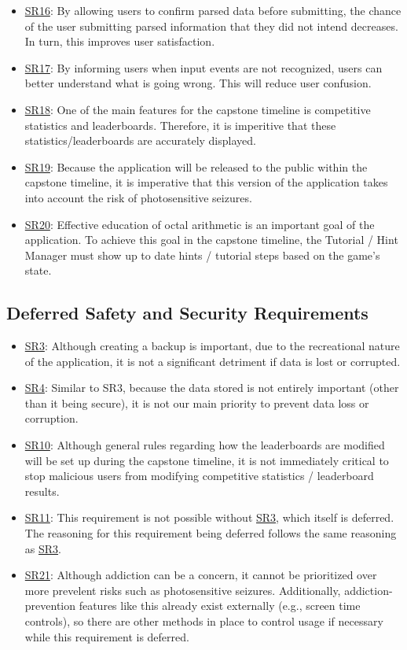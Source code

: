 \documentclass{article}
\begin{document}
\begin{itemize}
    \item \hyperref[req:SR16]{SR16}: By allowing users to confirm parsed data before submitting, the chance of the user submitting parsed information that they did not intend decreases. In turn, this improves user satisfaction.
    \item \hyperref[req:SR17]{SR17}: By informing users when input events are not recognized, users can better understand what is going wrong. This will reduce user confusion.
    \item \hyperref[req:SR18]{SR18}: One of the main features for the capstone timeline is competitive statistics and leaderboards. Therefore, it is imperitive that these statistics/leaderboards are accurately displayed.
    \item \hyperref[req:SR19]{SR19}: Because the application will be released to the public within the capstone timeline, it is imperative that this version of the application takes into account the risk of photosensitive seizures.
    \item \hyperref[req:SR20]{SR20}: Effective education of octal arithmetic is an important goal of the application. To achieve this goal in the capstone timeline, the Tutorial / Hint Manager must show up to date hints / tutorial steps based on the game's state.
\end{itemize}

\subsection{Deferred Safety and Security Requirements}

\begin{itemize}
    \item \hyperref[req:SR3]{SR3}: Although creating a backup is important, due to the recreational nature of the application, it is not a significant detriment if data is lost or corrupted.
    \item \hyperref[req:SR4]{SR4}: Similar to SR3, because the data stored is not entirely important (other than it being secure), it is not our main priority to prevent data loss or corruption.
    \item \hyperref[req:SR10]{SR10}: Although general rules regarding how the leaderboards are modified will be set up during the capstone timeline, it is not immediately critical to stop malicious users from modifying competitive statistics / leaderboard results.
    \item \hyperref[req:SR11]{SR11}: This requirement is not possible without \hyperref[req:SR3]{SR3}, which itself is deferred. The reasoning for this requirement being deferred follows the same reasoning as \hyperref[req:SR3]{SR3}.
    \item \hyperref[req:SR21]{SR21}: Although addiction can be a concern, it cannot be prioritized over more prevelent risks such as photosensitive seizures. Additionally, addiction-prevention features like this already exist externally (e.g., screen time controls), so there are other methods in place to control usage if necessary while this requirement is deferred.
\end{itemize}
\end{document}
